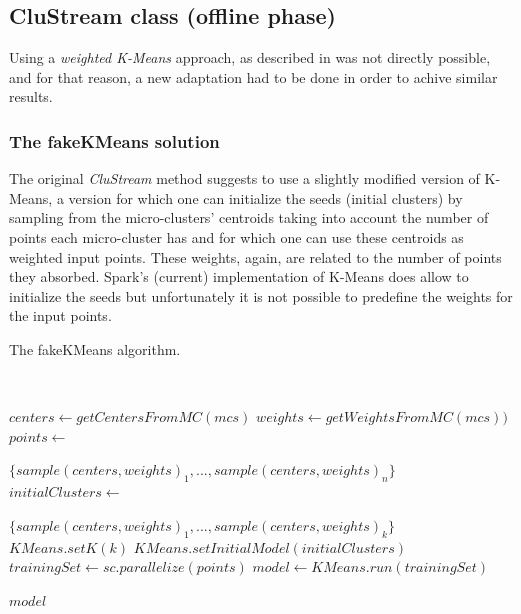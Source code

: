 \documentclass[10pt, conference, compsocconf]{IEEEtran}
\begin{document}
\subsection{CluStream class (offline phase)}

Using a \textit{weighted K-Means} approach, as described in \cite{clustreamOrig} was not directly possible, and for that reason, a new adaptation had to be done in order to achive similar results.


\subsubsection{The fakeKMeans solution}

The original \textit{CluStream} method suggests to use a slightly modified version of K-Means, a version for which one can initialize the seeds (initial clusters) by sampling from the micro-clusters' centroids taking into account the number of points each micro-cluster has and for which one can use these centroids as weighted input points. These weights, again, are related to the number of points they absorbed. Spark's (current) implementation of K-Means does allow to initialize the seeds but unfortunately it is not possible to predefine the weights for the input points.


\begin{algorithm}[h]
 \caption{The fakeKMeans algorithm.}\label{alg:fakekmeans}
 \begin{algorithmic}[1]
 
   \
  
   
  \vspace{10pt}
  
  \State $centers \gets getCentersFromMC(mcs)$
  \State $weights \gets getWeightsFromMC(mcs))$
  \State $points \gets $
  \item[] $\{sample(centers,weights)_1,... , sample(centers,weights)_{n}\}$
  \State $initialClusters \gets$ 
  \item[] $ \{sample(centers,weights)_1,... , sample(centers,weights)_k\}$
  \State $KMeans.setK(k)$
  \State $KMeans.setInitialModel(initialClusters)$
  \State $trainingSet \gets sc.parallelize(points)$
  \State $model \gets KMeans.run(trainingSet)$
  
  \Return $model$
 \end{algorithmic}
\end{algorithm}
\end{document}
